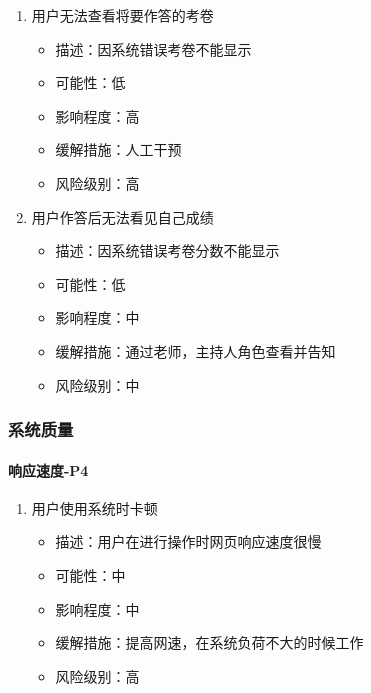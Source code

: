 \documentclass[hyperref, a4paper]{ctexart}
\providecommand{\tightlist}{%
  \setlength{\itemsep}{0pt}\setlength{\parskip}{0pt}}
\let\oldparagraph\paragraph
\renewcommand{\paragraph}[1]{\oldparagraph{#1}\mbox{}}
\begin{document}
\begin{enumerate}
\def\labelenumi{\arabic{enumi}.}
\tightlist
\item
  用户无法查看将要作答的考卷

  \begin{itemize}
  \tightlist
  \item
    描述：因系统错误考卷不能显示
  \item
    可能性：低
  \item
    影响程度：高
  \item
    缓解措施：人工干预
  \item
    风险级别：高
  \end{itemize}
\item
  用户作答后无法看见自己成绩

  \begin{itemize}
  \tightlist
  \item
    描述：因系统错误考卷分数不能显示
  \item
    可能性：低
  \item
    影响程度：中
  \item
    缓解措施：通过老师，主持人角色查看并告知
  \item
    风险级别：中
  \end{itemize}
\end{enumerate}

\hypertarget{ux7cfbux7edfux8d28ux91cf-1}{%
\subsubsection{系统质量}\label{ux7cfbux7edfux8d28ux91cf-1}}

\hypertarget{ux54cdux5e94ux901fux5ea6-p4}{%
\paragraph{响应速度-P4}\label{ux54cdux5e94ux901fux5ea6-p4}}

\begin{enumerate}
\def\labelenumi{\arabic{enumi}.}
\tightlist
\item
  用户使用系统时卡顿

  \begin{itemize}
  \tightlist
  \item
    描述：用户在进行操作时网页响应速度很慢
  \item
    可能性：中
  \item
    影响程度：中
  \item
    缓解措施：提高网速，在系统负荷不大的时候工作
  \item
    风险级别：高
  \end{itemize}
\end{enumerate}
\end{document}
